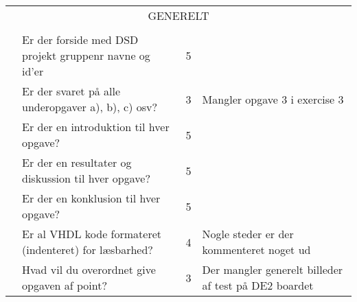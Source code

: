 \begin{table}[h]
    \small
    \begin{tabularx}{\textwidth}{p{3.5cm}Xp{5mm}X} &                                                        &                                                                           \\\midrule
        \multicolumn{4}{c}{GENERELT}                                                                                                                                        \\\midrule
                                       &                                                        &   &                                                                       \\
                                       & Er der forside med DSD projekt gruppenr navne og id'er & 5 &  \\
                                       & Er der svaret på alle underopgaver a), b), c) osv?     & 3 & Mangler opgave 3 i exercise 3                                        \\
                                       & Er der en introduktion til hver opgave?                & 5 &                                   \\
                                       & Er der en resultater og diskussion til hver opgave?    & 5 &                                     \\
                                       & Er der en konklusion til hver opgave?                  & 5 &                                     \\
                                       & Er al VHDL kode formateret (indenteret) for læsbarhed? & 4 & Nogle steder er der kommenteret noget ud    \\
                                       & Hvad vil du overordnet give opgaven af point?          & 3 & Der mangler generelt billeder af test på DE2 boardet               \\ \bottomrule
    \end{tabularx}
\end{table}
